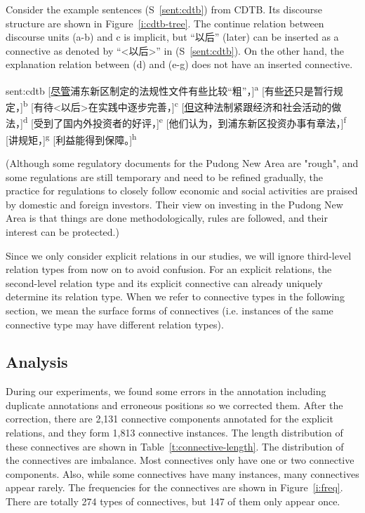 Consider the example sentences (S~\ref{sent:cdtb}) from CDTB. Its discourse
structure are shown in Figure~\ref{i:cdtb-tree}. The continue relation between
discourse units (a-b) and c is implicit, but ``以后'' (later) can be inserted
as a connective as denoted by ``<以后>'' in (S~\ref{sent:cdtb}).
On the other hand, the explanation relation between (d) and (e-g)
does not have an inserted connective.


\begin{sent}{sent:cdtb}{}
    [\underline{尽管}浦东新区制定的法规性文件有些比较``粗''，]\textsuperscript{a}
    [有些\underline{还}只是暂行规定，]\textsuperscript{b}
    [有待<以后>在实践中逐步完善，]\textsuperscript{c}
    [\underline{但}这种法制紧跟经济和社会活动的做法，]\textsuperscript{d}
    [受到了国内外投资者的好评，]\textsuperscript{e}
    [他们认为，到浦东新区投资办事有章法，]\textsuperscript{f}
    [讲规矩，]\textsuperscript{g}
    [利益能得到保障。]\textsuperscript{h}

    (Although some regulatory documents for the Pudong New Area are "rough",
    and some regulations are still temporary and
    need to be refined gradually,
    the practice for regulations to closely follow economic and social activities
    are praised by domestic and foreign investors.
    Their view on investing in the Pudong New Area is that
    things are done methodologically,
    rules are followed,
    and their interest can be protected.)
\end{sent}



Since we only consider explicit relations in our studies, we will ignore
third-level relation types from now on to avoid confusion.
For an explicit relations, the second-level relation type and its explicit
connective can already uniquely determine its relation type.
When we refer to connective types in the following section, we mean the
surface forms of connectives (i.e. instances of the same connective type
may have different relation types).

\subsection{Analysis}

During our experiments, we found some errors in the annotation including
duplicate annotations and erroneous positions so we corrected
them. After the correction, there are 2,131 connective components annotated
for the explicit relations, and they form 1,813 connective instances. The length
distribution of these connectives are shown in Table~\ref{t:connective-length}.
The distribution of the connectives are imbalance. Most connectives only have
one or two connective components. Also, while some connectives have many instances,
many connectives appear rarely. The frequencies for the connectives are shown
in Figure~\ref{i:freq}. There are totally 274 types of connectives, but
147 of them only appear once.

